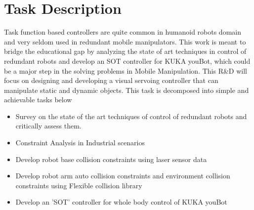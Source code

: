 \section{Task Description}
Task function based controllers are quite common in humanoid robots domain and very seldom used in redundant mobile manipulators. This work is meant to bridge the educational gap by analyzing the state of art techniques in control of redundant robots and develop an SOT controller for KUKA youBot, which could be a major step in the solving problems in Mobile Manipulation.
 This R\&D will focus on designing and developing a visual servoing controller that can manipulate static and dynamic objects. This task is decomposed into simple and achievable tasks below
 \begin{itemize}
 \item Survey on the state of the art techniques of control of redundant robots and critically assess them.
 \item Constraint Analysis in Industrial scenarios
 \item Develop robot base collision constraints using laser sensor data
 \item Develop robot arm auto collision constraints and environment collision constraints using Flexible collision library
 \item Develop an 'SOT' controller for whole body control of KUKA youBot 
 \end{itemize}
